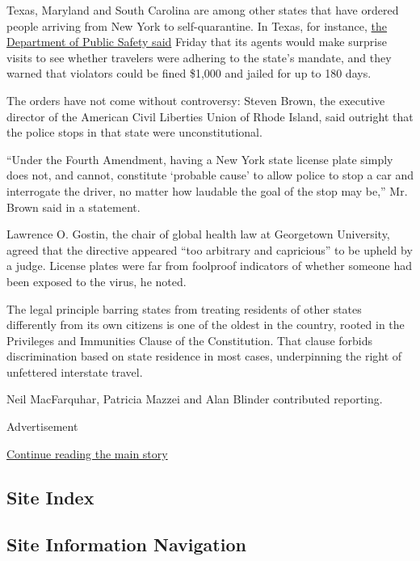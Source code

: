 Texas, Maryland and South Carolina are among other states that have
ordered people arriving from New York to self-quarantine. In Texas, for
instance,
\href{https://www.dps.texas.gov/director_staff/media_and_communications/pr/2020/0327a}{the
Department of Public Safety said} Friday that its agents would make
surprise visits to see whether travelers were adhering to the state's
mandate, and they warned that violators could be fined \$1,000 and
jailed for up to 180 days.

The orders have not come without controversy: Steven Brown, the
executive director of the American Civil Liberties Union of Rhode
Island, said outright that the police stops in that state were
unconstitutional.

``Under the Fourth Amendment, having a New York state license plate
simply does not, and cannot, constitute `probable cause' to allow police
to stop a car and interrogate the driver, no matter how laudable the
goal of the stop may be,'' Mr. Brown said in a statement.

Lawrence O. Gostin, the chair of global health law at Georgetown
University, agreed that the directive appeared ``too arbitrary and
capricious'' to be upheld by a judge. License plates were far from
foolproof indicators of whether someone had been exposed to the virus,
he noted.

The legal principle barring states from treating residents of other
states differently from its own citizens is one of the oldest in the
country, rooted in the Privileges and Immunities Clause of the
Constitution. That clause forbids discrimination based on state
residence in most cases, underpinning the right of unfettered interstate
travel.

Neil MacFarquhar, Patricia Mazzei and Alan Blinder contributed
reporting.

Advertisement

\protect\hyperlink{after-bottom}{Continue reading the main story}

\hypertarget{site-index}{%
\subsection{Site Index}\label{site-index}}

\hypertarget{site-information-navigation}{%
\subsection{Site Information
Navigation}\label{site-information-navigation}}

